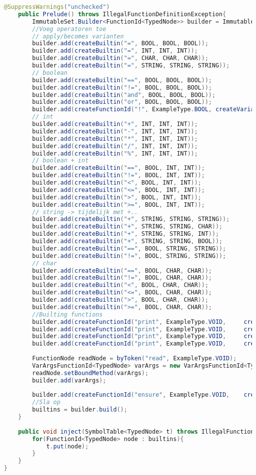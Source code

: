\begin{lstlisting}[language=Java]
	@SuppressWarnings("unchecked")
	public Prelude() throws IllegalFunctionDefinitionException{
		ImmutableSet.Builder<FunctionId<TypedNode>> builder = ImmutableSet.builder();
		//Voeg operatoren toe
		// apply/becomes varianten
		builder.add(createBuiltin("=", BOOL, BOOL, BOOL));
		builder.add(createBuiltin("=", INT, INT, INT));
		builder.add(createBuiltin("=", CHAR, CHAR, CHAR));
		builder.add(createBuiltin("=", STRING, STRING, STRING));
		// boolean
		builder.add(createBuiltin("==", BOOL, BOOL, BOOL));
		builder.add(createBuiltin("!=", BOOL, BOOL, BOOL));
		builder.add(createBuiltin("and", BOOL, BOOL, BOOL));
		builder.add(createBuiltin("or", BOOL, BOOL, BOOL));
		builder.add(createFunctionId("!", ExampleType.BOOL, createVariableId("rhs", ExampleType.BOOL)));
		// int
		builder.add(createBuiltin("+", INT, INT, INT));
		builder.add(createBuiltin("-", INT, INT, INT));
		builder.add(createBuiltin("*", INT, INT, INT));
		builder.add(createBuiltin("/", INT, INT, INT));
		builder.add(createBuiltin("%", INT, INT, INT));
		// boolean + int
		builder.add(createBuiltin("==", BOOL, INT, INT));
		builder.add(createBuiltin("!=", BOOL, INT, INT));
		builder.add(createBuiltin("<", BOOL, INT, INT));
		builder.add(createBuiltin("<=", BOOL, INT, INT));
		builder.add(createBuiltin(">", BOOL, INT, INT));
		builder.add(createBuiltin(">=", BOOL, INT, INT));
		// string -> tijdelijk met +..
		builder.add(createBuiltin("+", STRING, STRING, STRING));
		builder.add(createBuiltin("+", STRING, STRING, CHAR));
		builder.add(createBuiltin("+", STRING, STRING, INT));
		builder.add(createBuiltin("+", STRING, STRING, BOOL));
		builder.add(createBuiltin("==", BOOL, STRING, STRING));
		builder.add(createBuiltin("!=", BOOL, STRING, STRING));
		// char
		builder.add(createBuiltin("==", BOOL, CHAR, CHAR));
		builder.add(createBuiltin("!=", BOOL, CHAR, CHAR));
		builder.add(createBuiltin("<", BOOL, CHAR, CHAR));
		builder.add(createBuiltin("<=", BOOL, CHAR, CHAR));
		builder.add(createBuiltin(">", BOOL, CHAR, CHAR));
		builder.add(createBuiltin(">=", BOOL, CHAR, CHAR));
		//Builting functions
		builder.add(createFunctionId("print", ExampleType.VOID, 	createVariableId("str", ExampleType.STRING)));
		builder.add(createFunctionId("print", ExampleType.VOID, 	createVariableId("str", ExampleType.BOOL)));
		builder.add(createFunctionId("print", ExampleType.VOID, 	createVariableId("str", ExampleType.INT)));
		builder.add(createFunctionId("print", ExampleType.VOID, 	createVariableId("str", ExampleType.CHAR)));
		
		FunctionNode readNode = byToken("read", ExampleType.VOID);
		VarArgsFunctionId<TypedNode> varArgs = new VarArgsFunctionId<TypedNode>(readNode, ExampleType.VOID, ExampleType.CHAR, ExampleType.INT, ExampleType.STRING);
		readNode.setBoundMethod(varArgs);
		builder.add(varArgs);
		
		builder.add(createFunctionId("ensure", ExampleType.VOID,	createVariableId("expr", ExampleType.BOOL)));
		//Sla op
		builtins = builder.build();
	}
	
	public void inject(SymbolTable<TypedNode> t) throws IllegalFunctionDefinitionException{
		for(FunctionId<TypedNode> node : builtins){
			t.put(node);
		}
	}
}

\end{lstlisting}
